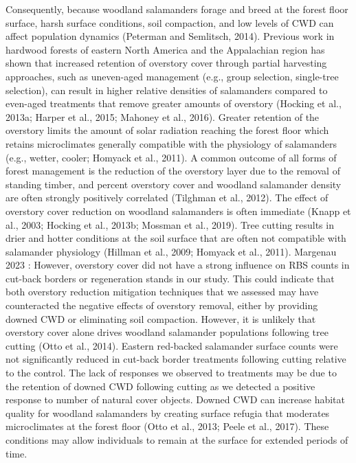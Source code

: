 Consequently, because woodland salamanders forage and breed at the forest floor surface, harsh surface conditions, soil compaction, and low levels of CWD can affect population dynamics (Peterman and Semlitsch, 2014).
Previous work in hardwood forests of eastern North America and the Appalachian region has shown that increased retention of overstory cover through partial harvesting approaches, such as uneven-aged management (e.g., group selection, single-tree selection), 
can result in higher relative densities of salamanders compared to even-aged treatments that remove greater amounts of overstory (Hocking et al., 2013a; Harper et al., 2015; Mahoney et al., 2016).
Greater retention of the overstory limits the amount of solar radiation reaching the forest floor which retains microclimates generally compatible with the physiology of salamanders (e.g., wetter, cooler; Homyack et al., 2011).
A common outcome of all forms of forest management is the reduction of the overstory layer due to the removal of standing timber, and percent overstory cover and woodland salamander density are often strongly positively correlated (Tilghman et al., 2012).
The effect of overstory cover reduction on woodland salamanders is often immediate (Knapp et al., 2003; Hocking et al., 2013b; Mossman et al., 2019).
Tree cutting results in drier and hotter conditions at the soil surface that are often not compatible with salamander physiology (Hillman et al., 2009; Homyack et al., 2011).
Margenau 2023 : However, overstory cover did not have a strong influence on RBS counts in cut-back borders or regeneration stands in our study. This could indicate that both overstory reduction mitigation techniques that we assessed may have counteracted the negative effects of overstory removal, either by providing downed CWD or eliminating soil compaction.
However, it is unlikely that overstory cover alone drives woodland salamander populations following tree cutting (Otto et al., 2014).
Eastern red-backed salamander surface counts were not significantly reduced in cut-back border treatments following cutting relative to the control. The lack of responses we observed to treatments may be due to the retention of downed CWD following cutting as we detected a positive response to number of natural cover objects. Downed CWD can increase habitat quality for woodland salamanders by creating surface refugia that moderates microclimates at the forest floor (Otto et al., 2013; Peele et al., 2017).
These conditions may allow individuals to remain at the surface for extended periods of time.

